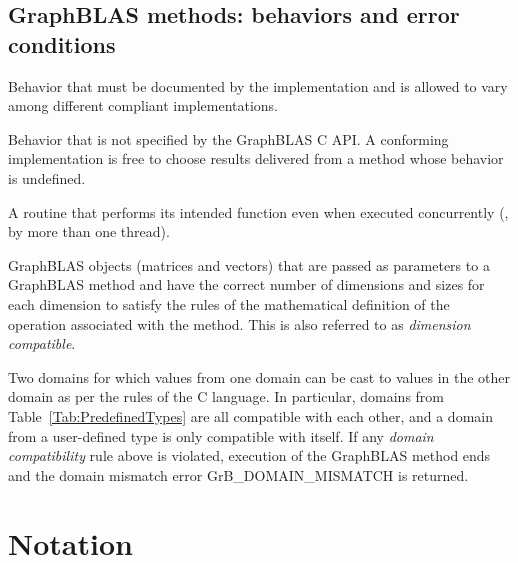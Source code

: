 \subsection{GraphBLAS methods: behaviors and error conditions}
\glossBegin
{} Behavior that must be documented
by the implementation and is allowed to vary among different
compliant implementations. 

 Behavior that is not specified by the GraphBLAS C API.
A conforming implementation is free to choose results delivered from a method
whose behavior is undefined. 

 A routine that performs its intended 
function even when executed concurrently (\ie, by more than one thread).

 GraphBLAS objects (matrices and vectors) that are
passed as parameters to a GraphBLAS method and have the correct number of dimensions 
and sizes for each dimension to satisfy the rules of the mathematical definition 
of the operation associated with the method.  This is also referred to as 
\emph{dimension compatible}.

 Two domains for which values from one domain can be 
cast to values in the other domain as per the rules of the C language. In particular, 
domains from Table~\ref{Tab:PredefinedTypes} 
are all compatible with each other, and a domain from a user-defined type is only 
compatible with itself. If any \emph{domain compatibility} rule above is 
violated, execution of the GraphBLAS method ends and the domain 
mismatch error {\sf GrB\_DOMAIN\_MISMATCH} is returned.
\glossEnd

\vfill


\section{Notation}


